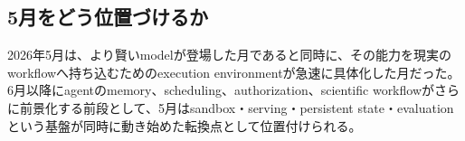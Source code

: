 \subsection*{5月をどう位置づけるか}
2026年5月は、より賢いmodelが登場した月であると同時に、その能力を現実のworkflowへ持ち込むためのexecution environmentが急速に具体化した月だった。6月以降にagentのmemory、scheduling、authorization、scientific workflowがさらに前景化する前段として、5月はsandbox・serving・persistent state・evaluationという基盤が同時に動き始めた転換点として位置付けられる。 \cite{src-01a8b52eee81,src-66be12207714,src-77e29e3fac8f,src-c97320147e8c,src-80b8d67933c0,src-f216d6cd7707,src-8c84b8422093}
